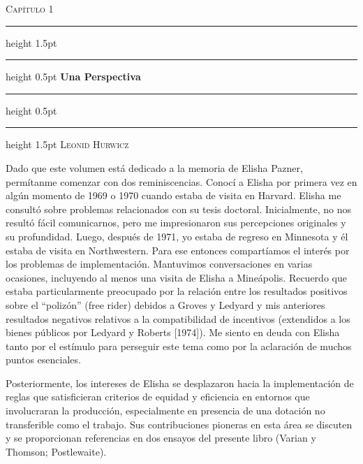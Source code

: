 \documentclass[12pt, letterpaper]{article}
\begin{document}
\begin{center}
    \vspace*{1cm}
    {\color{SlateGray}\textsc{Capítulo 1}} \\
    \vspace{0.4cm}
    \hrule height 1.5pt
    \vspace{0.2cm}
    \hrule height 0.5pt
    \vspace{0.6cm}
    {\huge\bfseries\color{MidnightBlue} Una Perspectiva} \\
    \vspace{0.6cm}
    \hrule height 0.5pt
    \vspace{0.2cm}
    \hrule height 1.5pt
    \vspace{0.8cm}
    {\Large\scshape Leonid Hurwicz} \\
    \vspace{1.5cm}
\end{center}



Dado que este volumen está dedicado a la memoria de Elisha Pazner, permítanme comenzar con dos reminiscencias. Conocí a Elisha por primera vez en algún momento de 1969 o 1970 cuando estaba de visita en Harvard. Elisha me consultó sobre problemas relacionados con su tesis doctoral. Inicialmente, no nos resultó fácil comunicarnos, pero me impresionaron sus percepciones originales y su profundidad. 
Luego, después de 1971, yo estaba de regreso en Minnesota y él estaba de visita en Northwestern. Para ese entonces compartíamos el interés por los problemas de implementación. Mantuvimos conversaciones en varias ocasiones, incluyendo al menos una visita de Elisha a Mineápolis. Recuerdo que estaba particularmente preocupado por la relación entre los resultados positivos sobre el ``polizón'' (free rider) debidos a Groves y Ledyard y mis anteriores resultados negativos relativos a la compatibilidad de incentivos (extendidos a los bienes públicos por Ledyard y Roberts [1974]). Me siento en deuda con Elisha tanto por el estímulo para perseguir este tema como por la aclaración de muchos puntos esenciales.

\medskip
Posteriormente, los intereses de Elisha se desplazaron hacia la implementación de reglas que satisficieran criterios de equidad y eficiencia en entornos que involucraran la producción, especialmente en presencia de una dotación no transferible como el trabajo. Sus contribuciones pioneras en esta área se discuten y se proporcionan referencias en dos ensayos del presente libro (Varian y Thomson; Postlewaite). \\
\end{document}

